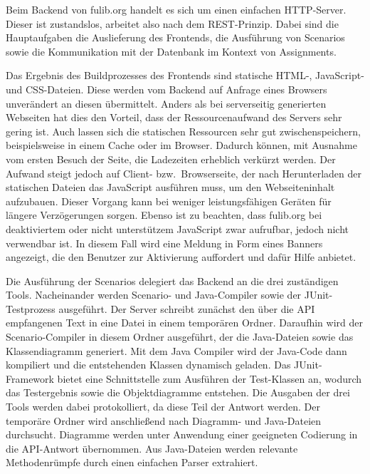Beim Backend von fulib.org handelt es sich um einen einfachen HTTP-Server.
Dieser ist zustandslos, arbeitet also nach dem REST-Prinzip.
Dabei sind die Hauptaufgaben die Auslieferung des Frontends, die Ausführung von Scenarios sowie die Kommunikation mit der Datenbank im Kontext von Assignments.

Das Ergebnis des Buildprozesses des Frontends sind statische HTML-, JavaScript- und CSS-Dateien.
Diese werden vom Backend auf Anfrage eines Browsers unverändert an diesen übermittelt.
Anders als bei serverseitig generierten Webseiten hat dies den Vorteil, dass der Ressourcenaufwand des Servers sehr gering ist.
Auch lassen sich die statischen Ressourcen sehr gut zwischenspeichern, beispielsweise in einem Cache oder im Browser.
Dadurch können, mit Ausnahme vom ersten Besuch der Seite, die Ladezeiten erheblich verkürzt werden.
Der Aufwand steigt jedoch auf Client- bzw.\ Browserseite, der nach Herunterladen der statischen Dateien das JavaScript ausführen muss, um den Webseiteninhalt aufzubauen.
Dieser Vorgang kann bei weniger leistungsfähigen Geräten für längere Verzögerungen sorgen.
Ebenso ist zu beachten, dass fulib.org bei deaktiviertem oder nicht unterstützem JavaScript zwar aufrufbar, jedoch nicht verwendbar ist.
In diesem Fall wird eine Meldung in Form eines Banners angezeigt, die den Benutzer zur Aktivierung auffordert und dafür Hilfe anbietet.

Die Ausführung der Scenarios delegiert das Backend an die drei zuständigen Tools.
Nacheinander werden Scenario- und Java-Compiler sowie der JUnit-Testprozess ausgeführt.
Der Server schreibt zunächst den über die API empfangenen Text in eine Datei in einem temporären Ordner.
Daraufhin wird der Scenario-Compiler in diesem Ordner ausgeführt, der die Java-Dateien sowie das Klassendiagramm generiert.
Mit dem Java Compiler wird der Java-Code dann kompiliert und die entstehenden Klassen dynamisch geladen.
Das JUnit-Framework bietet eine Schnittstelle zum Ausführen der Test-Klassen an, wodurch das Testergebnis sowie die Objektdiagramme entstehen.
Die Ausgaben der drei Tools werden dabei protokolliert, da diese Teil der Antwort werden.
Der temporäre Ordner wird anschließend nach Diagramm- und Java-Dateien durchsucht.
Diagramme werden unter Anwendung einer geeigneten Codierung in die API-Antwort übernommen.
Aus Java-Dateien werden relevante Methodenrümpfe durch einen einfachen Parser extrahiert.

